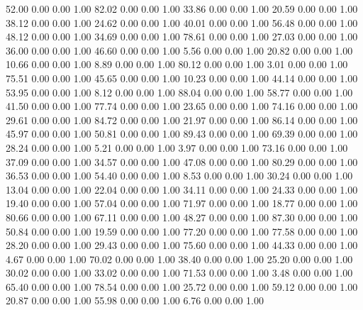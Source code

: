    52.00   0.00   0.00   1.00
   82.02   0.00   0.00   1.00
   33.86   0.00   0.00   1.00
   20.59   0.00   0.00   1.00
   38.12   0.00   0.00   1.00
   24.62   0.00   0.00   1.00
   40.01   0.00   0.00   1.00
   56.48   0.00   0.00   1.00
   48.12   0.00   0.00   1.00
   34.69   0.00   0.00   1.00
   78.61   0.00   0.00   1.00
   27.03   0.00   0.00   1.00
   36.00   0.00   0.00   1.00
   46.60   0.00   0.00   1.00
    5.56   0.00   0.00   1.00
   20.82   0.00   0.00   1.00
   10.66   0.00   0.00   1.00
    8.89   0.00   0.00   1.00
   80.12   0.00   0.00   1.00
    3.01   0.00   0.00   1.00
   75.51   0.00   0.00   1.00
   45.65   0.00   0.00   1.00
   10.23   0.00   0.00   1.00
   44.14   0.00   0.00   1.00
   53.95   0.00   0.00   1.00
    8.12   0.00   0.00   1.00
   88.04   0.00   0.00   1.00
   58.77   0.00   0.00   1.00
   41.50   0.00   0.00   1.00
   77.74   0.00   0.00   1.00
   23.65   0.00   0.00   1.00
   74.16   0.00   0.00   1.00
   29.61   0.00   0.00   1.00
   84.72   0.00   0.00   1.00
   21.97   0.00   0.00   1.00
   86.14   0.00   0.00   1.00
   45.97   0.00   0.00   1.00
   50.81   0.00   0.00   1.00
   89.43   0.00   0.00   1.00
   69.39   0.00   0.00   1.00
   28.24   0.00   0.00   1.00
    5.21   0.00   0.00   1.00
    3.97   0.00   0.00   1.00
   73.16   0.00   0.00   1.00
   37.09   0.00   0.00   1.00
   34.57   0.00   0.00   1.00
   47.08   0.00   0.00   1.00
   80.29   0.00   0.00   1.00
   36.53   0.00   0.00   1.00
   54.40   0.00   0.00   1.00
    8.53   0.00   0.00   1.00
   30.24   0.00   0.00   1.00
   13.04   0.00   0.00   1.00
   22.04   0.00   0.00   1.00
   34.11   0.00   0.00   1.00
   24.33   0.00   0.00   1.00
   19.40   0.00   0.00   1.00
   57.04   0.00   0.00   1.00
   71.97   0.00   0.00   1.00
   18.77   0.00   0.00   1.00
   80.66   0.00   0.00   1.00
   67.11   0.00   0.00   1.00
   48.27   0.00   0.00   1.00
   87.30   0.00   0.00   1.00
   50.84   0.00   0.00   1.00
   19.59   0.00   0.00   1.00
   77.20   0.00   0.00   1.00
   77.58   0.00   0.00   1.00
   28.20   0.00   0.00   1.00
   29.43   0.00   0.00   1.00
   75.60   0.00   0.00   1.00
   44.33   0.00   0.00   1.00
    4.67   0.00   0.00   1.00
   70.02   0.00   0.00   1.00
   38.40   0.00   0.00   1.00
   25.20   0.00   0.00   1.00
   30.02   0.00   0.00   1.00
   33.02   0.00   0.00   1.00
   71.53   0.00   0.00   1.00
    3.48   0.00   0.00   1.00
   65.40   0.00   0.00   1.00
   78.54   0.00   0.00   1.00
   25.72   0.00   0.00   1.00
   59.12   0.00   0.00   1.00
   20.87   0.00   0.00   1.00
   55.98   0.00   0.00   1.00
    6.76   0.00   0.00   1.00
